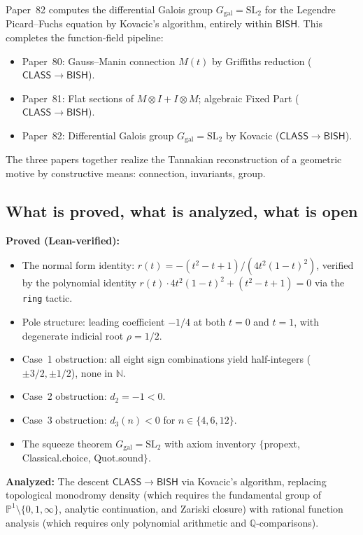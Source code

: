 \documentclass[11pt]{article}
\theoremstyle{plain}
\theoremstyle{definition}
\theoremstyle{remark}
\newcommand{\N}{\mathbb{N}}
\newcommand{\Q}{\mathbb{Q}}
\newcommand{\SL}{\mathrm{SL}}
\newcommand{\Ggal}{G_{\mathrm{gal}}}
\newcommand{\BISH}{\mathsf{BISH}}
\newcommand{\CLASS}{\mathsf{CLASS}}
\begin{document}
Paper~82 computes the differential Galois group $\Ggal = \SL_2$ for the Legendre Picard--Fuchs equation by Kovacic's algorithm, entirely within $\BISH$.
This completes the function-field pipeline:
\begin{itemize}
  \item Paper~80: Gauss--Manin connection $M(t)$ by Griffiths reduction ($\CLASS \to \BISH$).
  \item Paper~81: Flat sections of $M \otimes I + I \otimes M$; algebraic Fixed Part ($\CLASS \to \BISH$).
  \item Paper~82: Differential Galois group $\Ggal = \SL_2$ by Kovacic ($\CLASS \to \BISH$).
\end{itemize}
The three papers together realize the Tannakian reconstruction of a geometric motive by constructive means: connection, invariants, group.

\subsection{What is proved, what is analyzed, what is open}

\textbf{Proved (Lean-verified):}
\begin{itemize}
  \item The normal form identity: $r(t) = -(t^2-t+1)/(4t^2(1-t)^2)$, verified by the polynomial identity $r(t) \cdot 4t^2(1-t)^2 + (t^2-t+1) = 0$ via the \texttt{ring} tactic.
  \item Pole structure: leading coefficient $-1/4$ at both $t = 0$ and $t = 1$, with degenerate indicial root $\rho = 1/2$.
  \item Case~1 obstruction: all eight sign combinations yield half-integers ($\pm 3/2, \pm 1/2$), none in $\N$.
  \item Case~2 obstruction: $d_2 = -1 < 0$.
  \item Case~3 obstruction: $d_3(n) < 0$ for $n \in \{4, 6, 12\}$.
  \item The squeeze theorem $\Ggal = \SL_2$ with axiom inventory $\{$propext, Classical.choice, Quot.sound$\}$.
\end{itemize}

\textbf{Analyzed:} The descent $\CLASS \to \BISH$ via Kovacic's algorithm, replacing topological monodromy density (which requires the fundamental group of $\mathbb{P}^1 \setminus \{0,1,\infty\}$, analytic continuation, and Zariski closure) with rational function analysis (which requires only polynomial arithmetic and $\Q$-comparisons).
\end{document}
